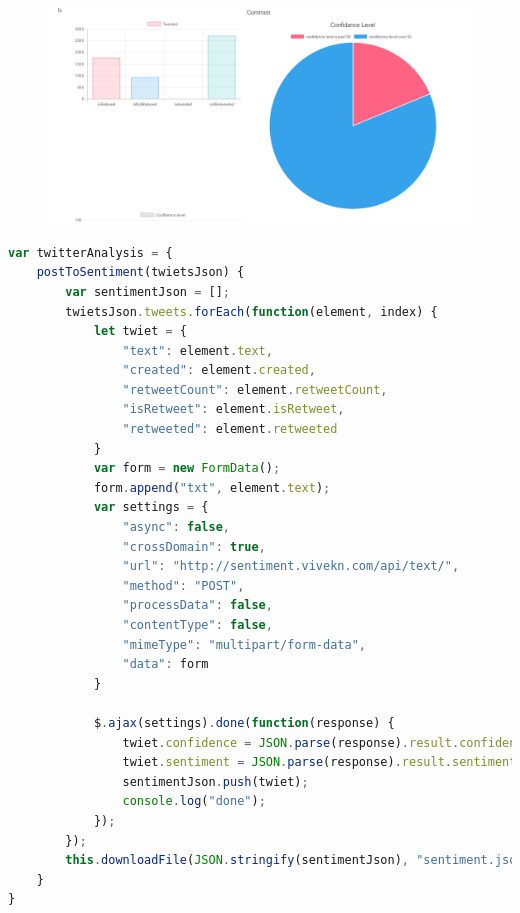 \begin{figure}[h]
	\centering
	\includegraphics[width=\textwidth]{images/app2.png}
\end{figure}

\vfill

\begin{lstlisting}[language=JavaScript]
var twitterAnalysis = {
    postToSentiment(twietsJson) {
        var sentimentJson = [];
        twietsJson.tweets.forEach(function(element, index) {
            let twiet = {
                "text": element.text,
                "created": element.created,
                "retweetCount": element.retweetCount,
                "isRetweet": element.isRetweet,
                "retweeted": element.retweeted
            }
            var form = new FormData();
            form.append("txt", element.text);
            var settings = {
                "async": false,
                "crossDomain": true,
                "url": "http://sentiment.vivekn.com/api/text/",
                "method": "POST",
                "processData": false,
                "contentType": false,
                "mimeType": "multipart/form-data",
                "data": form
            }

            $.ajax(settings).done(function(response) {
                twiet.confidence = JSON.parse(response).result.confidence
                twiet.sentiment = JSON.parse(response).result.sentiment
                sentimentJson.push(twiet);
                console.log("done");
            });
        });
        this.downloadFile(JSON.stringify(sentimentJson), "sentiment.json");
    }
}
\end{lstlisting}
